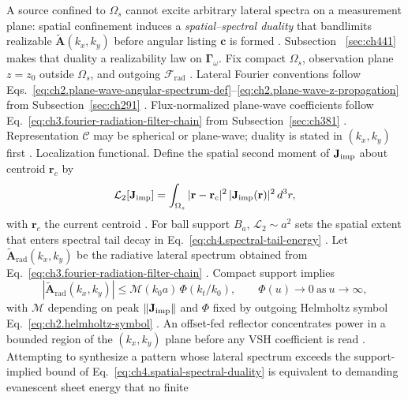 A source confined to \(\Omega_{s}\) cannot excite arbitrary lateral spectra on a measurement plane: spatial
confinement induces a \emph{spatial--spectral duality} that bandlimits realizable \(\widetilde{\mathbf{A}}(k_{x},k_{y})\)
before angular listing \(\mathbf{c}\) is formed \cite{stratton1941}. Subsection
~\ref{sec:ch441} makes that duality a realizability law on \(\boldsymbol{\Gamma}_\omega\).
Fix compact \(\Omega_{s}\), observation plane \(z=z_{0}\) outside \(\Omega_{s}\), and outgoing
\(\mathcal{F}_{\mathrm{rad}}\) \cite{stratton1941}. Lateral Fourier conventions follow
Eqs.~\eqref{eq:ch2.plane-wave-angular-spectrum-def}--\eqref{eq:ch2.plane-wave-z-propagation} from
Subsection~\ref{sec:ch291} \cite{stratton1941}. Flux-normalized plane-wave coefficients follow
Eq.~\eqref{eq:ch3.fourier-radiation-filter-chain} from Subsection~\ref{sec:ch381} \cite{hansen1988}.
Representation \(\mathcal{C}\) may be spherical or plane-wave; duality is stated in \((k_{x},k_{y})\) first
\cite{stratton1941}.
Localization functional. Define the spatial second moment of \(\mathbf{J}_{\mathrm{imp}}\) about centroid \(\mathbf{r}_{c}\) by
\begin{equation}
\label{eq:ch4.localization-moment}
\mathcal{L}_{2}[\mathbf{J}_{\mathrm{imp}}]
=
\int_{\Omega_{s}}|\mathbf{r}-\mathbf{r}_{c}|^{2}\,|\mathbf{J}_{\mathrm{imp}}(\mathbf{r})|^{2}\,d^{3}r,
\end{equation}
with \(\mathbf{r}_{c}\) the current centroid \cite{jackson1999}. For ball support \(B_{a}\),
\(\mathcal{L}_{2}\sim a^{2}\) sets the spatial extent that enters spectral tail decay in
Eq.~\eqref{eq:ch4.spectral-tail-energy} \cite{hansen1988}.
Let \(\widetilde{\mathbf{A}}_{\mathrm{rad}}(k_{x},k_{y})\) be the radiative lateral spectrum obtained from
Eq.~\eqref{eq:ch3.fourier-radiation-filter-chain} \cite{harrington2001}. Compact support implies
\begin{equation}
\label{eq:ch4.spatial-spectral-duality}
|\widetilde{\mathbf{A}}_{\mathrm{rad}}(k_{x},k_{y})|
\le
\mathcal{M}(k_{0}a)\,\Phi(k_{t}/k_{0}),
\qquad
\Phi(u)\to0\ \text{as}\ u\to\infty,
\end{equation}
with \(\mathcal{M}\) depending on peak \(\|\mathbf{J}_{\mathrm{imp}}\|\) and \(\Phi\) fixed by outgoing Helmholtz symbol
Eq.~\eqref{eq:ch2.helmholtz-symbol} \cite{stratton1941}.
An offset-fed reflector concentrates power in a bounded region of the $(k_{x},k_{y})$ plane before any VSH
coefficient is read \cite{stratton1941}.
Attempting to synthesize a pattern whose lateral spectrum exceeds the support-implied bound of
Eq.~\eqref{eq:ch4.spatial-spectral-duality} is equivalent to demanding evanescent sheet energy that no finite
